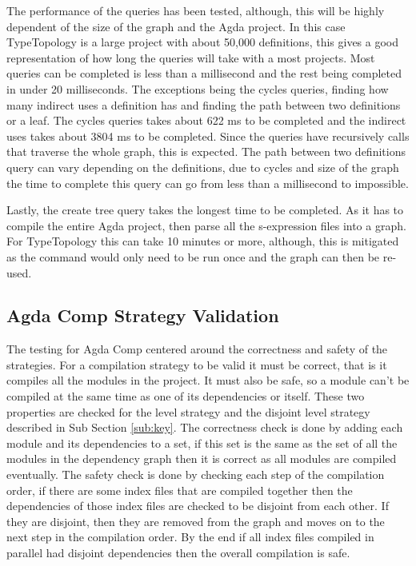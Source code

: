 The performance of the queries has been tested, although, this will be highly
dependent of the size of the graph and the Agda project. In this case
TypeTopology is a large project with about 50,000 definitions, this gives a
good representation of how long the queries will take with a most projects.
Most queries can be completed is less than a millisecond and the rest being
completed in under 20 milliseconds. The exceptions being the cycles queries,
finding how many indirect uses a definition has and finding the path between
two definitions or a leaf. The cycles queries takes about 622 ms to be
completed and the indirect uses takes about 3804 ms to be completed. Since the
queries have recursively calls that traverse the whole graph, this is expected.
The path between two definitions query can vary depending on the definitions,
due to cycles and size of the graph the time to complete this query can go from
less than a millisecond to impossible.

Lastly, the create tree query takes the longest time to be completed. As it has
to compile the entire Agda project, then parse all the s-expression files into
a graph. For TypeTopology this can take 10 minutes or more, although, this is
mitigated as the command would only need to be run once and the graph can then
be re-used.

\subsection{Agda Comp Strategy Validation}

The testing for Agda Comp centered around the correctness and safety of the
strategies. For a compilation strategy to be valid it must be correct, that is
it compiles all the modules in the project. It must also be safe, so a module
can't be compiled at the same time as one of its dependencies or itself. These
two properties are checked for the level strategy and the disjoint level
strategy described in Sub Section \ref{sub:key}. The correctness check is done
by adding each module and its dependencies to a set, if this set is the same as
the set of all the modules in the dependency graph then it is correct as all
modules are compiled eventually. The safety check is done by checking each step
of the compilation order, if there are some index files that are compiled
together then the dependencies of those index files are checked to be disjoint
from each other. If they are disjoint, then they are removed from the graph and
moves on to the next step in the compilation order. By the end if all index
files compiled in parallel had disjoint dependencies then the overall
compilation is safe.

